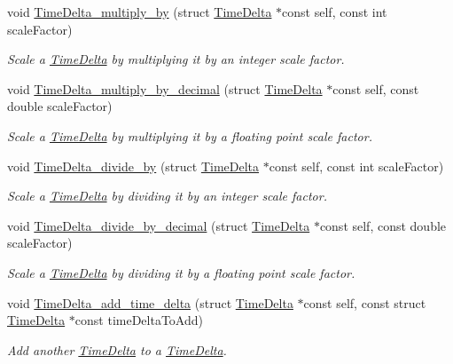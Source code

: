 \begin{DoxyCompactItemize}
void \hyperlink{time-delta_8h_ab70f5dfbbe9363021f533a4b1e3bf2be}{\-Time\-Delta\-\_\-multiply\-\_\-by} (struct \hyperlink{structTimeDelta}{\-Time\-Delta} $\ast$const self, const int scale\-Factor)
\begin{DoxyCompactList}\small\item\em \-Scale a \hyperlink{structTimeDelta}{\-Time\-Delta} by multiplying it by an integer scale factor. \end{DoxyCompactList}\item 
void \hyperlink{time-delta_8h_aa1e03be2346f1441127a828a3fe02568}{\-Time\-Delta\-\_\-multiply\-\_\-by\-\_\-decimal} (struct \hyperlink{structTimeDelta}{\-Time\-Delta} $\ast$const self, const double scale\-Factor)
\begin{DoxyCompactList}\small\item\em \-Scale a \hyperlink{structTimeDelta}{\-Time\-Delta} by multiplying it by a floating point scale factor. \end{DoxyCompactList}\item 
void \hyperlink{time-delta_8h_a5c6754df68d1166d92e15c48885e861e}{\-Time\-Delta\-\_\-divide\-\_\-by} (struct \hyperlink{structTimeDelta}{\-Time\-Delta} $\ast$const self, const int scale\-Factor)
\begin{DoxyCompactList}\small\item\em \-Scale a \hyperlink{structTimeDelta}{\-Time\-Delta} by dividing it by an integer scale factor. \end{DoxyCompactList}\item 
void \hyperlink{time-delta_8h_a31fffdb820891d79283aca56a3aeb853}{\-Time\-Delta\-\_\-divide\-\_\-by\-\_\-decimal} (struct \hyperlink{structTimeDelta}{\-Time\-Delta} $\ast$const self, const double scale\-Factor)
\begin{DoxyCompactList}\small\item\em \-Scale a \hyperlink{structTimeDelta}{\-Time\-Delta} by dividing it by a floating point scale factor. \end{DoxyCompactList}\item 
void \hyperlink{time-delta_8h_a7b8c837c0a4c63f4a214ffca0e8c9592}{\-Time\-Delta\-\_\-add\-\_\-time\-\_\-delta} (struct \hyperlink{structTimeDelta}{\-Time\-Delta} $\ast$const self, const struct \hyperlink{structTimeDelta}{\-Time\-Delta} $\ast$const time\-Delta\-To\-Add)
\begin{DoxyCompactList}\small\item\em \-Add another \hyperlink{structTimeDelta}{\-Time\-Delta} to a \hyperlink{structTimeDelta}{\-Time\-Delta}. \end{DoxyCompactList}\item 

\end{DoxyCompactItemize}
